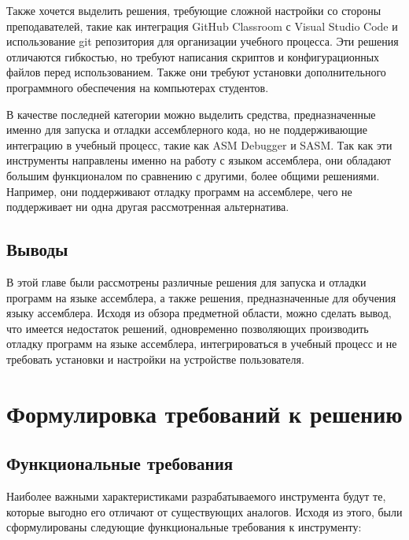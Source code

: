 \documentclass[a4paper,article,14pt]{extarticle}
\begin{document}
Также хочется выделить решения, требующие сложной настройки со стороны преподавателей, такие как интеграция GitHub Classroom с Visual Studio Code и использование git репозитория для организации учебного процесса. Эти решения отличаются гибкостью, но требуют написания скриптов и конфигурационных файлов перед использованием. Также они требуют установки дополнительного программного обеспечения на компьютерах студентов.

В качестве последней категории можно выделить средства, предназначенные именно для запуска и отладки ассемблерного кода, но не поддерживающие интеграцию в учебный процесс, такие как ASM Debugger и SASM. Так как эти инструменты направлены именно на работу с языком ассемблера, они обладают большим функционалом по сравнению с другими, более общими решениями. Например, они поддерживают отладку программ на ассемблере, чего не поддерживает ни одна другая рассмотренная альтернатива.

\subsection{Выводы}

В этой главе были рассмотрены различные решения для запуска и отладки программ на языке ассемблера, а также решения, предназначенные для обучения языку ассемблера. Исходя из обзора предметной области, можно сделать вывод, что имеется недостаток решений, одновременно позволяющих производить отладку программ на языке ассемблера, интегрироваться в учебный процесс и не требовать установки и настройки на устройстве пользователя.

\section{Формулировка требований к решению}

\subsection{Функциональные требования}

Наиболее важными характеристиками разрабатываемого инструмента будут те, которые выгодно его отличают от существующих аналогов. Исходя из этого, были сформулированы следующие функциональные требования к инструменту:
\end{document}
